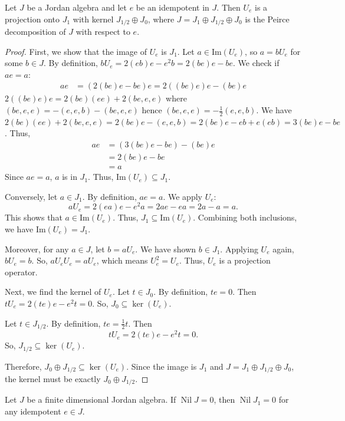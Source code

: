 \documentclass{article}
\begin{document}
\begin{lemma}  
Let $J$ be a Jordan algebra and let $e$ be an idempotent in $J$. Then $U_e$ is a projection onto $J_1$ with kernel $J_{1/2} \oplus J_0$, where $J = J_1 \oplus J_{1/2} \oplus J_0$ is the Peirce decomposition of $J$ with respect to $e$.  
\end{lemma}  
\begin{proof}  
First, we show that the image of $U_e$ is $J_1$. Let $a \in \mathrm{Im}(U_e)$, so $a = bU_e$ for some $b \in J$. By definition, $bU_e = 2(eb)e - e^2b = 2(be)e - be$.  
We check if $ae = a$:  
\begin{align*}  
    ae &= (2(be)e - be)e = 2((be)e)e - (be)e  
\end{align*}  
$ 2((be)e)e=2(be)(ee)+2(be,e,e) $ where $ (be,e,e)=-(e,e,b)-(be,e,e) $ hence $ (be,e,e)=-\frac{1}{2}(e,e,b) $. We have $2(be)(ee)+2(be,e,e)= 2(be)e-(e,e,b)=2(be)e-eb+e(eb)=3(be)e - be $. Thus,    
\begin{align*}  
    ae &= (3(be)e - be) - (be)e \\
    &= 2(be)e - be \\
    &= a  
\end{align*}  
Since $ae=a$, $a$ is in $J_1$. Thus, $\mathrm{Im}(U_e) \subseteq J_1$.  

Conversely, let $a \in J_1$. By definition, $ae = a$. We apply $U_e$:  
\[ aU_e = 2(ea)e - e^2a = 2ae - ea = 2a - a = a. \]  
This shows that $a \in \mathrm{Im}(U_e)$. Thus, $J_1 \subseteq \mathrm{Im}(U_e)$.  
Combining both inclusions, we have $\mathrm{Im}(U_e) = J_1$.  

Moreover, for any $a \in J$, let $b=aU_e$. We have shown $b \in J_1$. Applying $U_e$ again, $bU_e = b$. So, $aU_eU_e = aU_e$, which means $U_e^2 = U_e$. Thus, $U_e$ is a projection operator.  

Next, we find the kernel of $U_e$. Let $t \in J_0$. By definition, $te=0$. Then $tU_e = 2(te)e - e^2t = 0$. So, $J_0 \subseteq \ker(U_e)$.  

Let $t \in J_{1/2}$. By definition, $te = \frac{1}{2}t$. Then  
\[ tU_e = 2(te)e - e^2t = 0. \]  
So, $J_{1/2} \subseteq \ker(U_e)$.  

Therefore, $J_0 \oplus J_{1/2} \subseteq \ker(U_e)$. Since the image is $J_1$ and $J=J_1 \oplus J_{1/2} \oplus J_0$, the kernel must be exactly $J_0 \oplus J_{1/2}$.  
\end{proof}  

\begin{lemma}  
Let $J$ be a finite dimensional Jordan algebra. If $\operatorname{Nil} J = 0$, then $\operatorname{Nil} J_1 = 0$ for any idempotent $e \in J$.  
\end{lemma}  
\end{document}
